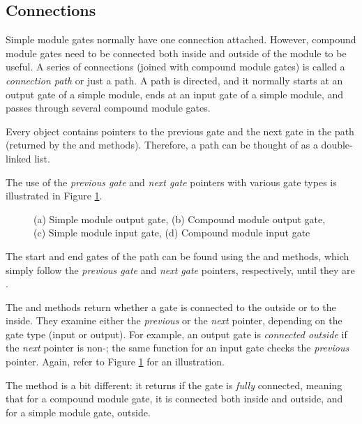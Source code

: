 \subsection{Connections}
\label{sec:simple-modules:connections}

Simple module gates normally have one connection attached. However, compound module
gates need to be connected both inside and outside of the
module to be useful. A series of connections (joined with compound
module gates) is called a \textit{connection path} or just a path.
A path is directed, and it normally starts at an output gate of
a simple module, ends at an input gate of a simple module,
and passes through several compound module gates.

Every  object contains pointers to the previous gate
and the next gate in the path (returned by the 
and  methods). Therefore, a path can be thought of as
a double-linked list.

The use of the \textit{previous gate} and \textit{next gate} pointers
with various gate types is illustrated in Figure
\ref{fig:ch-simple-modules:gates}.

\begin{figure}[htbp]
  \begin{center}
    
    \caption{(a) Simple module output gate, (b) Compound module output gate,
             (c) Simple module input gate, (d) Compound module input gate}
    \label{fig:ch-simple-modules:gates}
  \end{center}
\end{figure}

The start and end gates of the path can be found using the 
and  methods, which simply follow the \textit{previous gate} and
\textit{next gate} pointers, respectively, until they are .

The  and  methods
return whether a gate is connected to the outside or to the inside. They
examine either the \textit{previous} or the \textit{next} pointer, depending on the
gate type (input or output). For example, an output gate is \textit{connected outside}
if the \textit{next} pointer is non-; the same function for an input gate
checks the \textit{previous} pointer. Again, refer to Figure \ref{fig:ch-simple-modules:gates}
for an illustration.

The  method is a bit different: it returns  if the gate
is \textit{fully} connected, meaning that for a compound module gate,
it is connected both inside and outside, and for a simple module gate, outside.


